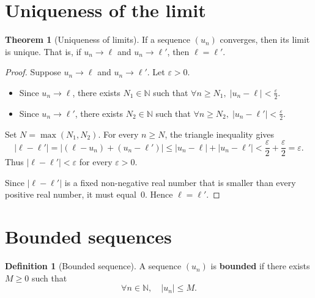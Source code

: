 \documentclass[12pt,a4paper,openany]{book}
\newcommand{\N}{\mathbb{N}}
\newcommand{\eps}{\varepsilon}
\newcommand{\abs}[1]{\left\lvert #1 \right\rvert}
\theoremstyle{definition}
\newtheorem{definition}{Definition}[chapter]
\newtheorem{theorem}{Theorem}[chapter]
\theoremstyle{remark}
\begin{document}
\section{Uniqueness of the limit}\label{sec:uniqueness}

\begin{theorem}[Uniqueness of limits]\label{thm:limit-unique}
If a sequence $(u_n)$ converges, then its limit is unique. That is, if
$u_n \to \ell$ and $u_n \to \ell'$, then $\ell = \ell'$.
\end{theorem}

\begin{proof}
Suppose $u_n \to \ell$ and $u_n \to \ell'$. Let $\eps > 0$.
\begin{itemize}
\item Since $u_n \to \ell$, there exists $N_1 \in \N$ such that
      $\forall n \geq N_1,\; \abs{u_n - \ell} < \frac{\eps}{2}$.
\item Since $u_n \to \ell'$, there exists $N_2 \in \N$ such that
      $\forall n \geq N_2,\; \abs{u_n - \ell'} < \frac{\eps}{2}$.
\end{itemize}
Set $N = \max(N_1, N_2)$. For every $n \geq N$, the triangle inequality gives
\[
   \abs{\ell - \ell'}
   = \abs{(\ell - u_n) + (u_n - \ell')}
   \leq \abs{u_n - \ell} + \abs{u_n - \ell'}
   < \frac{\eps}{2} + \frac{\eps}{2}
   = \eps.
\]
Thus $\abs{\ell - \ell'} < \eps$ for every $\eps > 0$.

Since $\abs{\ell - \ell'}$ is a fixed non-negative real number that is smaller
than every positive real number, it must equal~$0$. Hence $\ell = \ell'$.
\end{proof}

\section{Bounded sequences}\label{sec:bounded-seq}

\begin{definition}[Bounded sequence]\label{def:bounded-seq}
A sequence $(u_n)$ is \textbf{bounded} if there exists $M \geq 0$
such that
\[
   \forall n \in \N, \quad \abs{u_n} \leq M.
\]
\end{definition}
\end{document}
